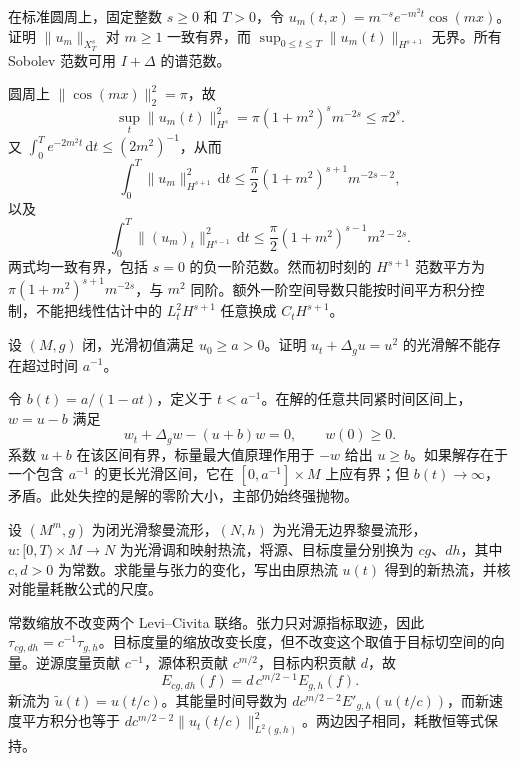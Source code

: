 \begin{exercise}\label{g3:ex:heat-energy-space-sharpness}
	在标准圆周上，固定整数 \(s\ge0\) 和 \(T>0\)，令 \(u_m(t,x)=m^{-s}e^{-m^2t}\cos(mx)\)。证明 \(\|u_m\|_{X_T^s}\) 对 \(m\ge1\) 一致有界，而 \(\sup_{0\le t\le T}\|u_m(t)\|_{H^{s+1}}\) 无界。所有 Sobolev 范数可用 \(I+\Delta\) 的谱范数。
\end{exercise}
\begin{solution}
	圆周上 \(\|\cos(mx)\|_2^2=\pi\)，故
	\[
		\sup_t\|u_m(t)\|_{H^s}^2=\pi(1+m^2)^sm^{-2s}\le\pi2^s.
	\]
	又 \(\int_0^Te^{-2m^2t}\,\mathrm dt\le(2m^2)^{-1}\)，从而
	\[
		\int_0^T\|u_m\|_{H^{s+1}}^2\,\mathrm dt
		\le\frac\pi2(1+m^2)^{s+1}m^{-2s-2},
	\]
	以及
	\[
		\int_0^T\|(u_m)_t\|_{H^{s-1}}^2\,\mathrm dt
		\le\frac\pi2(1+m^2)^{s-1}m^{2-2s}.
	\]
	两式均一致有界，包括 \(s=0\) 的负一阶范数。然而初时刻的 \(H^{s+1}\) 范数平方为 \(\pi(1+m^2)^{s+1}m^{-2s}\)，与 \(m^2\) 同阶。额外一阶空间导数只能按时间平方积分控制，不能把线性估计中的 \(L_t^2H^{s+1}\) 任意换成 \(C_tH^{s+1}\)。
\end{solution}

\begin{exercise}\label{g3:ex:reaction-diffusion-lifespan}
	设 \((M,g)\) 闭，光滑初值满足 \(u_0\ge a>0\)。证明 \(u_t+\Delta_gu=u^2\) 的光滑解不能存在超过时间 \(a^{-1}\)。
\end{exercise}
\begin{solution}
	令 \(b(t)=a/(1-at)\)，定义于 \(t<a^{-1}\)。在解的任意共同紧时间区间上，\(w=u-b\) 满足
	\[
		w_t+\Delta_gw-(u+b)w=0,\qquad w(0)\ge0.
	\]
	系数 \(u+b\) 在该区间有界，标量最大值原理作用于 \(-w\) 给出 \(u\ge b\)。如果解存在于一个包含 \(a^{-1}\) 的更长光滑区间，它在 \([0,a^{-1}]\times M\) 上应有界；但 \(b(t)\to\infty\)，矛盾。此处失控的是解的零阶大小，主部仍始终强抛物。
\end{solution}

\begin{exercise}\label{g3:ex:harmonic-heat-metric-scalings}
	设 \((M^m,g)\) 为闭光滑黎曼流形，\((N,h)\) 为光滑无边界黎曼流形，\(u:[0,T)\times M\to N\) 为光滑调和映射热流，将源、目标度量分别换为 \(cg\)、\(dh\)，其中 \(c,d>0\) 为常数。求能量与张力的变化，写出由原热流 \(u(t)\) 得到的新热流，并核对能量耗散公式的尺度。
\end{exercise}
\begin{solution}
	常数缩放不改变两个 Levi--Civita 联络。张力只对源指标取迹，因此 \(\tau_{cg,dh}=c^{-1}\tau_{g,h}\)。目标度量的缩放改变长度，但不改变这个取值于目标切空间的向量。逆源度量贡献 \(c^{-1}\)，源体积贡献 \(c^{m/2}\)，目标内积贡献 \(d\)，故
	\[
		E_{cg,dh}(f)=d\,c^{m/2-1}E_{g,h}(f).
	\]
	新流为 \(\widetilde u(t)=u(t/c)\)。其能量时间导数为 \(dc^{m/2-2}E'_{g,h}(u(t/c))\)，而新速度平方积分也等于 \(dc^{m/2-2}\|u_t(t/c)\|_{L^2(g,h)}^2\)。两边因子相同，耗散恒等式保持。
\end{solution}

